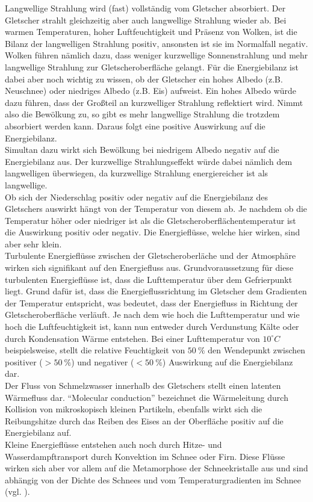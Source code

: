 \documentclass[12pt,a4paper]{article}
\begin{document}
Langwellige Strahlung wird (fast) vollständig vom Gletscher absorbiert. Der Gletscher strahlt gleichzeitig aber auch langwellige Strahlung wieder ab. Bei warmen Temperaturen, hoher Luftfeuchtigkeit und Präsenz von Wolken, ist die Bilanz der langwelligen Strahlung positiv, ansonsten ist sie im Normalfall negativ.\\
Wolken führen nämlich dazu, dass weniger kurzwellige Sonnenstrahlung und mehr langwellige Strahlung zur Gletscheroberfläche gelangt. Für die Energiebilanz ist dabei aber noch wichtig zu wissen, ob der Gletscher ein hohes Albedo (z.B. Neuschnee) oder niedriges Albedo (z.B. Eis) aufweist. Ein hohes Albedo würde dazu führen, dass der Großteil an kurzwelliger Strahlung reflektiert wird. Nimmt also die Bewölkung zu, so gibt es mehr langwellige Strahlung die trotzdem absorbiert werden kann. Daraus folgt eine positive Auswirkung auf die Energiebilanz.\\
Simultan dazu wirkt sich Bewölkung bei niedrigem Albedo negativ auf die Energiebilanz aus. Der kurzwellige Strahlungseffekt würde dabei nämlich dem langwelligen überwiegen, da kurzwellige Strahlung energiereicher ist als langwellige.\\

Ob sich der Niederschlag positiv oder negativ auf die Energiebilanz des Gletschers auswirkt hängt von der Temperatur von diesem ab. Je nachdem ob die Temperatur höher oder niedriger ist als die Gletscheroberflächentemperatur ist die Auswirkung positiv oder negativ. Die Energieflüsse, welche hier wirken, sind aber sehr klein.\\

Turbulente Energieflüsse zwischen der Gletscheroberläche und der Atmosphäre wirken sich signifikant auf den Energiefluss aus. Grundvoraussetzung für diese turbulenten Energieflüsse ist, dass die Lufttemperatur über dem Gefrierpunkt liegt. Grund dafür ist, dass die Energieflussrichtung im Gletscher dem Gradienten der Temperatur entspricht, was bedeutet, dass der Energiefluss in Richtung der Gletscheroberfläche verläuft. Je nach dem wie hoch die Lufttemperatur und wie hoch die Luftfeuchtigkeit ist, kann nun entweder durch Verdunstung Kälte oder durch Kondensation Wärme entstehen. Bei einer Lufttemperatur von $10^\circ C$ beispielsweise, stellt die relative Feuchtigkeit von $50~\%$ den Wendepunkt zwischen positiver ($>50~\%$) und negativer ($<50~\%$) Auswirkung auf die Energiebilanz dar.\\

Der Fluss von Schmelzwasser innerhalb des Gletschers stellt einen latenten Wärmefluss dar. 
``Molecular conduction'' bezeichnet die Wärmeleitung durch Kollision von mikroskopisch kleinen Partikeln, ebenfalls wirkt sich die Reibungshitze durch das Reiben des Eises an der Oberfläche positiv auf die Energiebilanz auf.\\
Kleine Energieflüsse entstehen auch noch durch Hitze- und Wasserdampftransport durch Konvektion im Schnee oder Firn. Diese Flüsse wirken sich aber vor allem auf die Metamorphose der Schneekristalle aus und sind abhängig von der Dichte des Schnees und vom Temperaturgradienten im Schnee (vgl. \cite[16, 17]{Themicroclimateofvalleyglaciers}).
\end{document}
